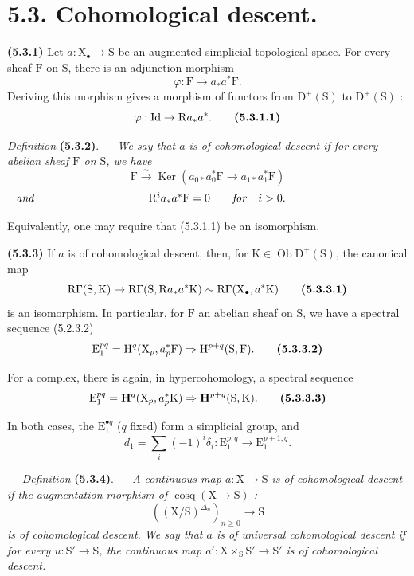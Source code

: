 \documentclass[11pt,leqno]{article}
\newcommand{\Page}[1]{\ifvmode\noindent\else\unskip\ \fi{\footnotesize\textcolor{gray}{[p.\,#1]}}\ \ignorespaces}
\begin{document}
\section*{5.3. Cohomological descent.}

\textbf{(5.3.1)} Let \(a:\mathrm{X}_{\bullet}\to\mathrm{S}\) be an augmented simplicial topological space. For every sheaf \(\mathrm{F}\) on \(\mathrm{S}\), there is an adjunction morphism
\[
\varphi:\mathrm{F}\to a_*a^*\mathrm{F}.
\]
Deriving this morphism gives a morphism of functors from \(\mathrm{D}^{+}(\mathrm{S})\) to \(\mathrm{D}^{+}(\mathrm{S})\) :
\[
\varphi:\mathrm{Id}\to\mathrm{R}a_*a^*.
\tag*{\textbf{(5.3.1.1)}}
\]

\textit{Definition} \textbf{(5.3.2)}. — \textit{We say that \(a\) is of \textup{cohomological descent} if for every abelian sheaf \(\mathrm{F}\) on \(\mathrm{S}\), we have}
\[
\mathrm{F}\xrightarrow{\sim}
\operatorname{Ker}(a_{0*}a_{0}^{*}\mathrm{F}\to a_{1*}a_{1}^{*}\mathrm{F})
\]
\[
\makebox[\linewidth]{\textit{and}\hfill
\(\mathrm{R}^{i}a_*a^*\mathrm{F}=0
\qquad\text{\textit{for}}\quad i>0.\)\hfill}
\]

Equivalently, one may require that (5.3.1.1) be an isomorphism.

\textbf{(5.3.3)} If \(a\) is of cohomological descent, then, for \(\mathrm{K}\in\operatorname{Ob}\mathrm{D}^{+}(\mathrm{S})\), the canonical map
\[
\mathrm{R}\Gamma(\mathrm{S},\mathrm{K})
\to\mathrm{R}\Gamma(\mathrm{S},\mathrm{R}a_*a^*\mathrm{K})
\sim\mathrm{R}\Gamma(\mathrm{X}_{\bullet},a^*\mathrm{K})
\tag*{\textbf{(5.3.3.1)}}
\]
is an isomorphism. In particular, for \(\mathrm{F}\) an abelian sheaf on \(\mathrm{S}\), we have a spectral sequence (5.2.3.2)
\[
\mathrm{E}_{1}^{pq}=\mathrm{H}^{q}(\mathrm{X}_{p},a_{p}^{*}\mathrm{F})
\Rightarrow\mathrm{H}^{p+q}(\mathrm{S},\mathrm{F}).
\tag*{\textbf{(5.3.3.2)}}
\]

For a complex, there is again, in hypercohomology, a spectral sequence
\[
\mathrm{E}_{1}^{pq}=\mathbf{H}^{q}(\mathrm{X}_{p},a_{p}^{*}\mathrm{K})
\Rightarrow\mathbf{H}^{p+q}(\mathrm{S},\mathrm{K}).
\tag*{\textbf{(5.3.3.3)}}
\]

In both cases, the \(\mathrm{E}_{1}^{\bullet q}\) (\(q\) fixed) form a simplicial group, and
\[
d_{1}=\sum_i(-1)^i\delta_i:
\mathrm{E}_{1}^{p,q}\to\mathrm{E}_{1}^{p+1,q}.
\]

\Page{15}
\textit{Definition} \textbf{(5.3.4)}. — \textit{A continuous map \(a:\mathrm{X}\to\mathrm{S}\) is of \textup{cohomological descent} if the augmentation morphism of \(\operatorname{cosq}(\mathrm{X}\to\mathrm{S})\) :}
\[
((\mathrm{X}/\mathrm{S})^{\Delta_n})_{n\geq 0}\to\mathrm{S}
\]
\textit{is of cohomological descent. We say that \(a\) is of \textup{universal cohomological descent} if for every \(u:\mathrm{S}'\to\mathrm{S}\), the continuous map \(a':\mathrm{X}\times_{\mathrm{S}}\mathrm{S}'\to\mathrm{S}'\) is of cohomological descent.}
\end{document}
